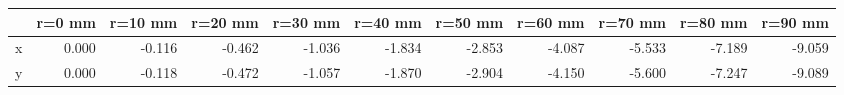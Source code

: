 \documentclass[convert={convertexe={magick.exe}}]{standalone}
\begin{document}
\begin{tabular}{lrrrrrrrrrr}
\toprule
{} &  r=0 mm &  r=10 mm &  r=20 mm &  r=30 mm &  r=40 mm &  r=50 mm &  r=60 mm &  r=70 mm &  r=80 mm &  r=90 mm \\
\midrule
x &   0.000 &   -0.116 &   -0.462 &   -1.036 &   -1.834 &   -2.853 &   -4.087 &   -5.533 &   -7.189 &   -9.059 \\
y &   0.000 &   -0.118 &   -0.472 &   -1.057 &   -1.870 &   -2.904 &   -4.150 &   -5.600 &   -7.247 &   -9.089 \\
\bottomrule
\end{tabular}
\end{document}
